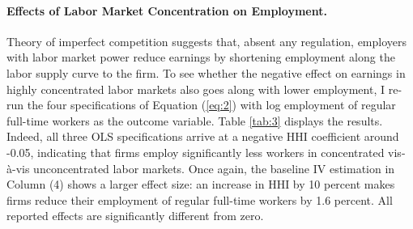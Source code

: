 \documentclass[11pt,oneside,reqno,xcolor=dvipsnames]{article} %
\begin{document}
\paragraph{Effects of Labor Market Concentration on Employment.} Theory of imperfect competition suggests that, absent any regulation, employers with labor market power reduce earnings by shortening employment along the labor supply curve to the firm. To see whether the negative effect on earnings in highly concentrated labor markets also goes along with lower employment, I re-run the four specifications of Equation (\ref{eq:2}) with log employment of regular full-time workers as the outcome variable. Table \ref{tab:3} displays the results. Indeed, all three OLS specifications arrive at a negative HHI coefficient around -0.05, indicating that firms employ significantly less workers in concentrated vis-\`{a}-vis unconcentrated labor markets. Once again, the baseline IV estimation in Column (4) shows a larger effect size: an increase in HHI by 10 percent makes firms reduce their employment of regular full-time workers by 1.6 percent. All reported effects are significantly different from zero.
\end{document}
